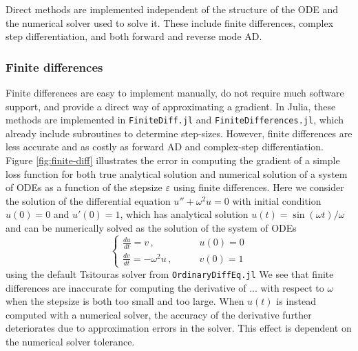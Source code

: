 Direct methods are implemented independent of the structure of the ODE and the numerical solver used to solve it. 
These include finite differences, complex step differentiation, and both forward and reverse mode AD. 

\subsubsection{Finite differences}

Finite differences are easy to implement manually, do not require much software support, and provide a direct way of approximating a gradient. 
In Julia, these methods are implemented in \texttt{FiniteDiff.jl} and \texttt{FiniteDifferences.jl}, which already include subroutines to determine step-sizes.
However, finite differences are less accurate and as costly as forward AD \cite{Griewank_1989} and complex-step differentiation. 
Figure \ref{fig:finite-diff} illustrates the error in computing the gradient of a simple loss function for both true analytical solution and numerical solution of a system of ODEs as a function of the stepsize $\varepsilon$ using finite differences.
Here we consider the solution of the differential equation $u'' + \omega^2 u = 0$ with initial condition $u(0)=0$ and $u'(0)=1$, which has analytical solution $u(t) = \sin(\omega t) / \omega$ and can be numerically solved as the solution of the system of ODEs
\begin{equation}
\begin{cases}
    \frac{du}{dt} = v \, ,  & \qquad u(0) = 0 \\
    \frac{dv}{dt} = - \omega^2 u \, ,  & \qquad v(0) = 1
\end{cases}
\end{equation}
using the default Tsitouras solver \cite{Tsitouras_2011} from \texttt{OrdinaryDiffEq.jl}
We see that finite differences are inaccurate for computing the derivative of ... with respect to $\omega$ when the stepsize is both too small and too large.
When $u(t)$ is instead computed with a numerical solver, the accuracy of the derivative further deteriorates due to approximation errors in the solver. 
This effect is dependent on the numerical solver tolerance.

